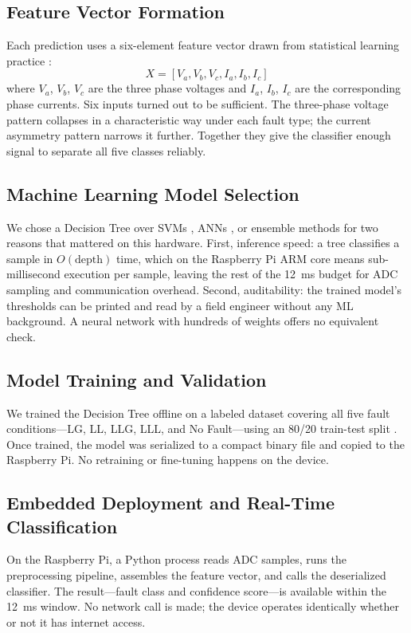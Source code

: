 \documentclass[journal]{IEEEtran}
\begin{document}
\subsection{Feature Vector Formation}
Each prediction uses a six-element feature vector drawn from statistical learning practice \cite{ref19}:
\begin{equation}
X = [V_a, V_b, V_c, I_a, I_b, I_c]
\end{equation}
where $V_a$, $V_b$, $V_c$ are the three phase voltages and $I_a$, $I_b$, $I_c$ are the corresponding phase currents. Six inputs turned out to be sufficient. The three-phase voltage pattern collapses in a characteristic way under each fault type; the current asymmetry pattern narrows it further. Together they give the classifier enough signal to separate all five classes reliably.

\subsection{Machine Learning Model Selection}
We chose a Decision Tree \cite{ref20,ref25} over SVMs \cite{ref6,ref8}, ANNs \cite{ref18}, or ensemble methods \cite{ref11} for two reasons that mattered on this hardware. First, inference speed: a tree classifies a sample in $O(\text{depth})$ time, which on the Raspberry Pi ARM core means sub-millisecond execution per sample, leaving the rest of the 12~ms budget for ADC sampling and communication overhead. Second, auditability: the trained model's thresholds can be printed and read by a field engineer without any ML background. A neural network with hundreds of weights offers no equivalent check.

\subsection{Model Training and Validation}
We trained the Decision Tree offline on a labeled dataset covering all five fault conditions---LG, LL, LLG, LLL, and No Fault---using an 80/20 train-test split \cite{ref25}. Once trained, the model was serialized to a compact binary file and copied to the Raspberry Pi. No retraining or fine-tuning happens on the device.

\subsection{Embedded Deployment and Real-Time Classification}
On the Raspberry Pi, a Python process reads ADC samples, runs the preprocessing pipeline, assembles the feature vector, and calls the deserialized classifier. The result---fault class and confidence score---is available within the 12~ms window. No network call is made; the device operates identically whether or not it has internet access.
\end{document}
